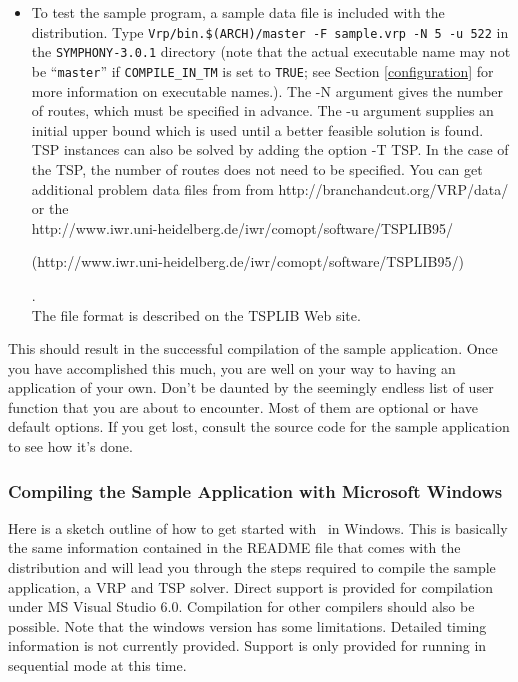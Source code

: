 \begin{itemize}
        \item To test the sample program, a sample data file is included with
the distribution. Type {\tt Vrp/bin.\$(ARCH)/master -F sample.vrp -N 5 -u
522} in the {\tt SYMPHONY-3.0.1} directory (note that the actual executable name may
not be ``{\tt master}'' if {\tt COMPILE\_IN\_TM} is set to {\tt TRUE}; see
Section \ref{configuration} for more information on executable names.). The -N
argument gives the number of routes, which must be specified in advance. The
-u argument supplies an initial upper bound which is used until a better
feasible solution is found. TSP instances can also be solved by adding the
option -T TSP. In the case of the TSP, the number of routes does not need to
be specified. You can get additional problem data files from from
{http://branchandcut.org/VRP/data/} or the \\
{http://www.iwr.uni-heidelberg.de/iwr/comopt/software/TSPLIB95/}
\begin{latexonly}
        (http://www.iwr.uni-heidelberg.de/iwr/comopt/software/TSPLIB95/)
\end{latexonly}. \\
The file
format is described on the TSPLIB Web site.

\end{itemize}

\noindent This should result in the successful compilation of the sample
application. Once you have accomplished this much, you are well on
your way to having an application of your own. Don't be daunted by the
seemingly endless list of user function that you are about to
encounter. Most of them are optional or have default options. If you
get lost, consult the source code for the sample application to see
how it's done.

\subsubsection{Compiling the Sample Application with Microsoft Windows}

Here is a sketch outline of how to get started with \BB\ in Windows. This is
basically the same information contained in the README file that comes with
the distribution and will lead you through the steps required to compile the
sample application, a VRP and TSP solver. Direct support is provided for
compilation under MS Visual Studio 6.0. Compilation for other compilers should
also be possible. Note that the windows version has some limitations. Detailed
timing information is not currently provided.  Support is only provided for
running in sequential mode at this time.

